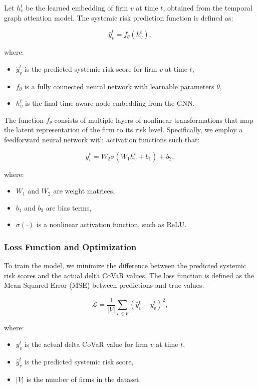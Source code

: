 \documentclass[preprint,12pt,authoryear]{elsarticle}
\begin{document}
Let \( h_v^t \) be the learned embedding of firm \( v \) at time \( t \), obtained from the temporal graph attention model. The systemic risk prediction function is defined as:

\[
\hat{y}_v^t = f_{\theta}(h_v^t),
\]

where:
\begin{itemize}
    \item \( \hat{y}_v^t \) is the predicted systemic risk score for firm \( v \) at time \( t \),
    \item \( f_{\theta} \) is a fully connected neural network with learnable parameters \( \theta \),
    \item \( h_v^t \) is the final time-aware node embedding from the GNN.
\end{itemize}

The function \( f_{\theta} \) consists of multiple layers of nonlinear transformations that map the latent representation of the firm to its risk level. Specifically, we employ a feedforward neural network with activation functions such that:

\[
\hat{y}_v^t = W_2 \sigma(W_1 h_v^t + b_1) + b_2,
\]

where:
\begin{itemize}
    \item \( W_1 \) and \( W_2 \) are weight matrices,
    \item \( b_1 \) and \( b_2 \) are bias terms,
    \item \( \sigma(\cdot) \) is a nonlinear activation function, such as ReLU.
\end{itemize}

\subsubsection{Loss Function and Optimization}  

To train the model, we minimize the difference between the predicted systemic risk scores and the actual delta CoVaR values. The loss function is defined as the Mean Squared Error (MSE) between predictions and true values:

\[
\mathcal{L} = \frac{1}{|V|} \sum_{v \in V} \left( \hat{y}_v^t - y_v^t \right)^2,
\]

where:
\begin{itemize}
    \item \( y_v^t \) is the actual delta CoVaR value for firm \( v \) at time \( t \),
    \item \( \hat{y}_v^t \) is the predicted systemic risk score,
    \item \( |V| \) is the number of firms in the dataset.
\end{itemize}
\end{document}
